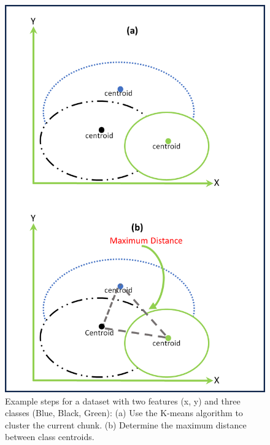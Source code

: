 \begin{figure}[!ht]
    \centering
    \begin{minipage}{0.48\textwidth}
        \centering
        \includegraphics[width=\linewidth]{5_Emerging/images/scenario1.png}
        \caption{Example steps for a dataset with two features (x, y) and three classes (Blue, Black, Green): (a) Use the K-means algorithm to cluster the current chunk. (b) Determine the maximum distance between class centroids.}
        \label{fig:scenario1}
    \end{minipage}
    \hfill
    \begin{minipage}{0.48\textwidth}
        \centering

\end{minipage}
\end{figure}
